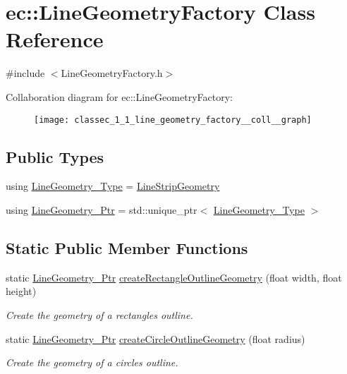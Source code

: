 \hypertarget{classec_1_1_line_geometry_factory}{}\section{ec\+:\+:Line\+Geometry\+Factory Class Reference}
\label{classec_1_1_line_geometry_factory}


{\ttfamily \#include $<$Line\+Geometry\+Factory.\+h$>$}



Collaboration diagram for ec\+:\+:Line\+Geometry\+Factory\+:\nopagebreak
\begin{figure}[H]
\begin{center}
\leavevmode
\texttt{[image: classec\_1\_1\_line\_geometry\_factory\_\_coll\_\_graph]}
\end{center}
\end{figure}
\subsection*{Public Types}
\begin{DoxyCompactItemize}
\item 
using \mbox{\hyperlink{classec_1_1_line_geometry_factory_a3025abbbb9ff132e43d46b17f1381213}{Line\+Geometry\+\_\+\+Type}} = \mbox{\hyperlink{classec_1_1_line_strip_geometry}{Line\+Strip\+Geometry}}
\item 
using \mbox{\hyperlink{classec_1_1_line_geometry_factory_a8f7bd7480ebc0dbc77930d81dcb69678}{Line\+Geometry\+\_\+\+Ptr}} = std\+::unique\+\_\+ptr$<$ \mbox{\hyperlink{classec_1_1_line_geometry_factory_a3025abbbb9ff132e43d46b17f1381213}{Line\+Geometry\+\_\+\+Type}} $>$
\end{DoxyCompactItemize}
\subsection*{Static Public Member Functions}
\begin{DoxyCompactItemize}
\item 
static \mbox{\hyperlink{classec_1_1_line_geometry_factory_a8f7bd7480ebc0dbc77930d81dcb69678}{Line\+Geometry\+\_\+\+Ptr}} \mbox{\hyperlink{classec_1_1_line_geometry_factory_ad5a4cbba96cb7d6fa979e6266c7a8912}{create\+Rectangle\+Outline\+Geometry}} (float width, float height)
\begin{DoxyCompactList}\small\item\em Create the geometry of a rectangle\textquotesingle{}s outline. \end{DoxyCompactList}\item 
static \mbox{\hyperlink{classec_1_1_line_geometry_factory_a8f7bd7480ebc0dbc77930d81dcb69678}{Line\+Geometry\+\_\+\+Ptr}} \mbox{\hyperlink{classec_1_1_line_geometry_factory_a7546d1c1b7125a621f2e8a652035e843}{create\+Circle\+Outline\+Geometry}} (float radius)
\begin{DoxyCompactList}\small\item\em Create the geometry of a circle\textquotesingle{}s outline. \end{DoxyCompactList}\end{DoxyCompactItemize}


